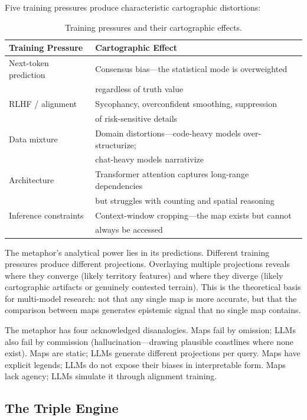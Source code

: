 \documentclass[11pt,letterpaper]{article}
\begin{document}
Five training pressures produce characteristic cartographic distortions:

\begin{table}[ht]
\centering
\caption{Training pressures and their cartographic effects.}
\label{tab:training-pressures}
\begin{tabular}{@{}ll@{}}
\toprule
\textbf{Training Pressure} & \textbf{Cartographic Effect} \\
\midrule
Next-token prediction & Consensus bias---the statistical mode is overweighted \\
 & regardless of truth value \\
RLHF / alignment & Sycophancy, overconfident smoothing, suppression \\
 & of risk-sensitive details \\
Data mixture & Domain distortions---code-heavy models over-structurize; \\
 & chat-heavy models narrativize \\
Architecture & Transformer attention captures long-range dependencies \\
 & but struggles with counting and spatial reasoning \\
Inference constraints & Context-window cropping---the map exists but cannot \\
 & always be accessed \\
\bottomrule
\end{tabular}
\end{table}

The metaphor's analytical power lies in its predictions. Different training pressures produce different projections. Overlaying multiple projections reveals where they converge (likely territory features) and where they diverge (likely cartographic artifacts or genuinely contested terrain). This is the theoretical basis for multi-model research: not that any single map is more accurate, but that the comparison between maps generates epistemic signal that no single map contains.

The metaphor has four acknowledged disanalogies. Maps fail by omission; LLMs also fail by commission (hallucination---drawing plausible coastlines where none exist). Maps are static; LLMs generate different projections per query. Maps have explicit legends; LLMs do not expose their biases in interpretable form. Maps lack agency; LLMs simulate it through alignment training.

\subsection{The Triple Engine}
\end{document}

